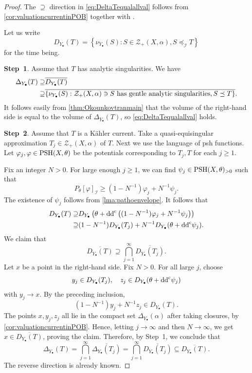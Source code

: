 \begin{proof}
    The $\supseteq$ direction in \eqref{eq:DeltaTequalallval} follows from \cref{cor:valuationcurrentinPOB} together with .

    Let us write
    \[
    D_{Y_{\bullet}}(T)=\left\{\nu_{Y_{\bullet}}(S):S\in \mathcal{Z}_+(X,\alpha),S\preceq_{\mathcal{I}}T\right\}
    \]
    for the time being.

    \textbf{Step~1}.
    Assume that $T$ has analytic singularities. We have
    \[
    \begin{split}
    \Delta_{Y_{\bullet}}(T)\supseteq & \overline{D_{Y_{\bullet}}(T)}\\
    \supseteq & \overline{\left\{\nu_{Y_{\bullet}}(S):\mathcal{Z}_+(X,\alpha)\ni S \textup{ has gentle analytic singularities}, S\preceq T\right\}}.
    \end{split}
    \]
    It follows easily from \cref{thm:Okounkovtranmain} that the volume of the right-hand side is equal to the volume of $\Delta_{Y_{\bullet}}(T)$, so \eqref{eq:DeltaTequalallval} holds.

    \textbf{Step~2}.
    Assume that $T$ is a Kähler current. Take a quasi-equisingular approximation $T_j\in \mathcal{Z}_+(X,\alpha)$ of $T$.
    Next we use the language of psh functions. Let $\varphi_j,\varphi\in \mathrm{PSH}(X,\theta)$ be the potentials corresponding to $T_j,T$ for each $j\geq 1$.

    Fix an integer $N>0$. For large enough $j\geq 1$, we can find $\psi_j\in \mathrm{PSH}(X,\theta)_{>0}$ such that
    \[
    P_{\theta}[\varphi]_{\mathcal{I}}\geq (1-N^{-1})\varphi_j+N^{-1} \psi_j.
    \]
    The existence of $\psi_j$ follows from \cref{lma:pathoenvelope}.
    It follows that
    \[
    \begin{aligned}
    D_{Y_{\bullet}}(T)\supseteq & D_{Y_{\bullet}}\left(\theta+\mathrm{dd}^{\mathrm{c}} \left((1-N^{-1})\varphi_j+N^{-1} \psi_j\right)\right)\\
    \supseteq & (1-N^{-1})D_{Y_{\bullet}}(T_j)+N^{-1} D_{Y_{\bullet}}(\theta+\mathrm{dd}^{\mathrm{c}} \psi_j).
    \end{aligned}
    \]
    We claim that
    \[
    \overline{D_{Y_{\bullet}}(T)}\supseteq \bigcap_{j=1}^{\infty}\overline{D_{Y_{\bullet}}(T_j)}.
    \]
    Let $x$ be a point in the right-hand side. Fix $N>0$. For all large $j$, choose
    \[
    y_j\in D_{Y_{\bullet}}(T_j),\quad z_j\in D_{Y_{\bullet}}(\theta+\mathrm{dd}^{\mathrm{c}} \psi_j)
    \]
    with $y_j\to x$. By the preceding inclusion,
    \[
    (1-N^{-1})y_j+N^{-1}z_j\in D_{Y_{\bullet}}(T).
    \]
    The points $x,y_j,z_j$ all lie in the compact set $\Delta_{Y_{\bullet}}(\alpha)$ after taking closures, by \cref{cor:valuationcurrentinPOB}. Hence, letting $j\to\infty$ and then $N\to\infty$, we get $x\in \overline{D_{Y_{\bullet}}(T)}$, proving the claim.
    Therefore, by Step~1, we conclude that
    \[
    \Delta_{Y_{\bullet}}(T)=\bigcap_{j=1}^{\infty}\overline{\Delta_{Y_{\bullet}}(T_j)}=\bigcap_{j=1}^{\infty}\overline{D_{Y_{\bullet}}(T_j)}\subseteq\overline{D_{Y_{\bullet}}(T)}.
    \]
The reverse direction is already known.


\end{proof}

